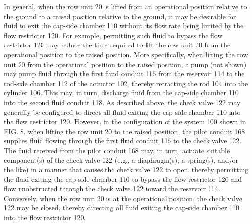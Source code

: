\documentclass[11pt,a4paper]{article}
\begin{document}
In general, when the row unit 20 is lifted from an operational position relative to the ground to a raised position relative to the ground, it may be desirable for fluid to exit the cap-side chamber 110 without its flow rate being limited by the flow restrictor 120. For example, permitting such fluid to bypass the flow restrictor 120 may reduce the time required to lift the row unit 20 from the operational position to the raised position. More specifically, when lifting the row unit 20 from the operational position to the raised position, a pump (not shown) may pump fluid through the first fluid conduit 116 from the reservoir 114 to the rod-side chamber 112 of the actuator 102, thereby retracting the rod 104 into the cylinder 106. This may, in turn, discharge fluid from the cap-side chamber 110 into the second fluid conduit 118. As described above, the check valve 122 may generally be configured to direct all fluid exiting the cap-side chamber 110 into the flow restrictor 120. However, in the configuration of the system 100 shown in FIG. 8, when lifting the row unit 20 to the raised position, the pilot conduit 168 supplies fluid flowing through the first fluid conduit 116 to the check valve 122. The fluid received from the pilot conduit 168 may, in turn, actuate suitable component(s) of the check valve 122 (e.g., a diaphragm(s), a spring(s), and/or the like) in a manner that causes the check valve 122 to open, thereby permitting the fluid exiting the cap-side chamber 110 to bypass the flow restrictor 120 and flow unobstructed through the check valve 122 toward the reservoir 114. Conversely, when the row unit 20 is at the operational position, the check valve 122 may be closed, thereby directing all fluid exiting the cap-side chamber 110 into the flow restrictor 120.
\end{document}
